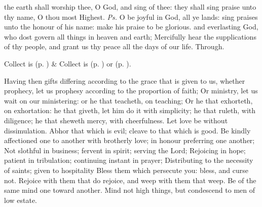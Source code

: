 \introit
{} the earth shall worship thee, O God, and sing of thee: they shall sing praise unto thy name, O thou most Highest. \textit{Ps.} O be joyful in God, all ye lands: sing praises unto the honour of his name: make his praise to be glorious.
\collect\label{EpiphanyIICollect}
 and everlasting God, who dost govern all things in heaven and earth; Mercifully hear the supplications of thy people, and grant us thy peace all the days of our life. Through.
\begin{rubric}
     Collect is  (p. \pageref{SPMaryPostChristmas}) \&  Collect is  (p. \pageref{SPAgainst}) or  (p. \pageref{SPChiefBishop}).
\end{rubric}
 Having then gifts differing according to the grace that is given to us, whether prophecy, let us prophesy according to the proportion of faith; Or ministry, let us wait on our ministering: or he that teacheth, on teaching; Or he that exhorteth, on exhortation: he that giveth, let him do it with simplicity; he that ruleth, with diligence; he that sheweth mercy, with cheerfulness. Let love be without dissimulation. Abhor that which is evil; cleave to that which is good. Be kindly affectioned one to another with brotherly love; in honour preferring one another; Not slothful in business; fervent in spirit; serving the Lord; Rejoicing in hope; patient in tribulation; continuing instant in prayer; Distributing to the necessity of saints; given to hospitality Bless them which persecute you: bless, and curse not. Rejoice with them that do rejoice, and weep with them that weep. Be of the same mind one toward another. Mind not high things, but condescend to men of low estate.

